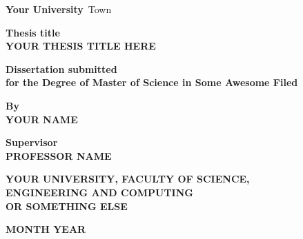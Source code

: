 \begin{titlepage}
\pagestyle{empty}
\begin{center}

\huge{\textbf{Your University}~Town}

\vspace{5cm}
\small{\textbf{Thesis title\\YOUR THESIS TITLE HERE}}

\vspace{2cm}
\small{\textbf{Dissertation submitted\\for the Degree of Master of Science in Some Awesome Filed}}


\vspace{2cm}
\small{\textbf{By\\YOUR NAME}}

\vspace{2cm}
\small{\textbf{Supervisor\\PROFESSOR NAME}}

\vfill
\small{\textbf{YOUR UNIVERSITY, FACULTY OF SCIENCE,\\ENGINEERING AND COMPUTING\\OR SOMETHING ELSE}}

\small{\textbf{MONTH YEAR}}

\end{center}
\end{titlepage}
